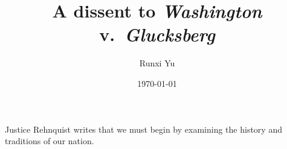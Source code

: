 \documentclass{scrartcl}
\title{A dissent to \textit{Washington} v.\ \textit{Glucksberg}}
\author{Runxi Yu}
\date{\today}
\begin{document}
\maketitle

Justice Rehnquist writes that we must begin by examining the history and traditions of our nation.
\end{document}
